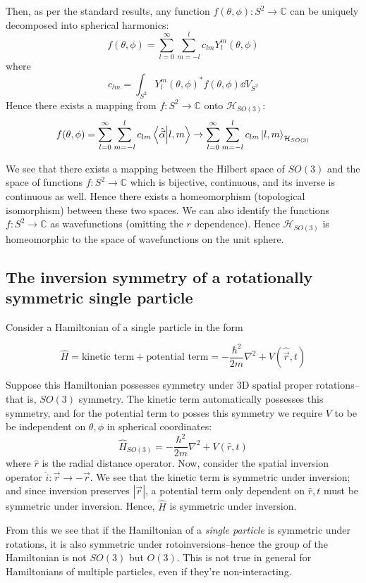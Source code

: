 \documentclass[12pt]{article}
\begin{document}
	Then, as per the standard results, any function $f(\theta,\phi):S^2\to\mathbb{C}$ can be uniquely decomposed into spherical harmonics:
	$$f(\theta,\phi)=\sum_{l=0}^\infty \sum_{m=-l}^l c_{lm} Y_l^m(\theta,\phi)$$
	where
	$$c_{lm}=\int_{S^2}Y_l^m(\theta, \phi)^*f(\theta, \phi)\dd{V}_{S^2}$$
	Hence there exists a mapping from $f:S^2\to\mathbb{C}$ onto $\mathcal{H}_{SO(3)}$:
	$$f(\theta,\phi)=\sum_{l=0}^\infty \sum_{m=-l}^l c_{lm} \braket{\hat{\vec{\alpha}}}{l,m}\to \sum_{l=0}^\infty \sum_{m=-l}^l c_{lm} \ket{l,m}_{\mathcal{H}_{SO(3)}}$$	
	
	We see that there exists a mapping between the Hilbert space of $SO(3)$ and the space of functions $f:S^2\to \mathbb{C}$ which is bijective, continuous, and its inverse is continuous as well. Hence there exists a homeomorphism (topological isomorphism) between these  two spaces. We can also identify the functions $f:S^2\to \mathbb{C}$ as wavefunctions (omitting the $r$ dependence). Hence $\mathcal{H}_{SO(3)}$ is homeomorphic to the space of wavefunctions on the unit sphere.
	
	\subsection{The inversion symmetry of a rotationally symmetric single particle}
	
	Consider a Hamiltonian of a single particle in the form
	
	$$\hat{H}=\text{kinetic term}+\text{potential term}=-\frac{\hbar^2}{2m}\nabla^2+V(\hat{\vec{r}}, t)$$
	
	Suppose this Hamiltonian possesses symmetry under 3D spatial proper rotations--that is, $SO(3)$ symmetry. The kinetic term automatically possesses this symmetry, and for the potential term to posses this symmetry we require $V$ to be be independent on $\theta,\phi$ in spherical coordinates:
	$$\hat{H}_{SO(3)}=-\frac{\hbar^2}{2m}\nabla^2+V(\hat{r}, t)$$
	where $\hat{r}$ is the radial distance operator. Now, consider the spatial inversion operator $\hat{i}:\vec{r}\to-\vec{r}$. We see that the kinetic term is symmetric under inversion; and since inversion preserves $|\vec{r}|$, a potential term only dependent on $\hat{r},t$ must be symmetric under inversion. Hence, $\hat{H}$ is symmetric under inversion.
	
	From this we see that if the Hamiltonian of a \textit{single particle} is symmetric under rotations, it is also symmetric under rotoinversions--hence the group of the Hamiltonian is not $SO(3)$ but $O(3)$. This is not true in general for Hamiltonians of multiple particles, even if they're non-interacting.
	
\end{document}

